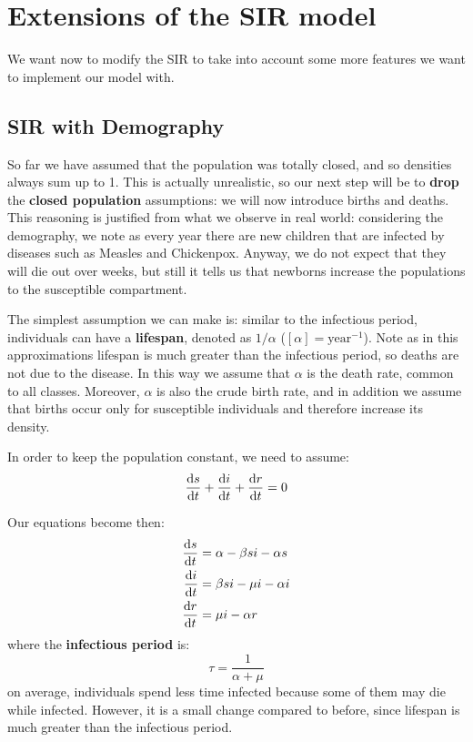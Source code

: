 \documentclass[../main/main.tex]{subfiles}
\begin{document}
\section{Extensions of the SIR model}
We want now to modify the SIR to take into account some more features we want to implement our model with.

\subsection{SIR with Demography}
So far we have assumed that the population was totally closed, and so densities always sum up to 1. This is actually unrealistic, so our next step will be to \textbf{drop} the \textbf{closed population} assumptions: we will now introduce births and deaths. This reasoning is justified from what we observe in real world: considering the demography, we note as every year there are new children that are infected by diseases such as Measles and Chickenpox. Anyway, we do not expect that they will die out over weeks, but still it tells us that newborns increase the populations to the susceptible compartment.

The simplest assumption we can make is: similar to the infectious period, individuals can have a \textbf{lifespan}, denoted as \( 1/\alpha  \) ($[\alpha]= \text{year}^{-1}$). Note as in this approximations lifespan is much greater than the infectious period, so deaths are not due to the disease. In this way we assume that \( \alpha  \) is the death rate, common to all classes. Moreover, \( \alpha  \) is also the crude birth rate, and in addition we assume that births occur only for susceptible individuals and therefore increase its density.

In order to keep the population constant, we need to assume:
\begin{equation}
  \dv{s}{t} + \dv{i}{t} + \dv{r}{t} = 0
\end{equation}

Our equations become then:
\begin{equation}
\begin{split}
  \dv{s}{t} &= \alpha - \beta s i - \alpha s  \\
  \dv{i}{t} &= \beta s i - \mu i - \alpha i \\
  \dv{r}{t} &= \mu i - \alpha r
\end{split}
\end{equation}
where the \textbf{infectious period} is:
\begin{equation}
  \tau = \frac{1}{\alpha + \mu }
\end{equation}
on average, individuals spend less time infected because some of them may die while infected. However, it is a small change compared to before, since lifespan is much greater than the infectious period.
\end{document}

